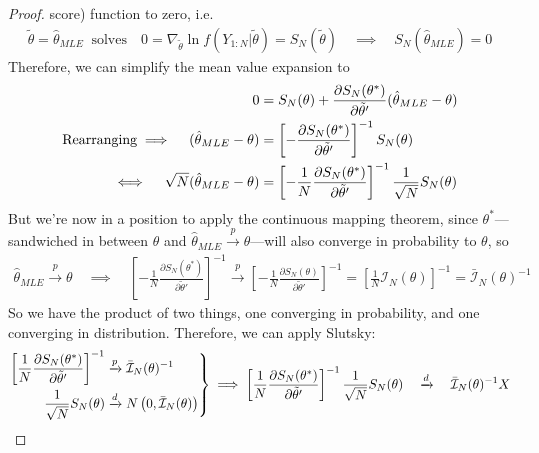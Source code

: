 \documentclass[12pt]{article}
\theoremstyle{plain}
\theoremstyle{definition}
\theoremstyle{remark}
\newcommand{\calI}{\mathcal{I}}
\newenvironment{rcases}
  {\left.\begin{aligned}}
  {\end{aligned}\right\rbrace}
\newcommand{\pto}{\xrightarrow{p}}
\newcommand{\dto}{\xrightarrow{d}}
\begin{document}
\begin{proof}
score) function to zero, i.e.
\begin{align*}
  \tilde{\theta} = \hat{\theta}_{MLE} \;\; \text{solves} \quad
  0 = \nabla_{\tilde{\theta}} \ln f(Y_{1:N}|\tilde{\theta})
  = S_N(\tilde{\theta})
  \quad\implies\quad
  S_N(\hat{\theta}_{MLE})=0
\end{align*}
Therefore, we can simplify the mean value expansion to
\begin{align}
  0
  &= S_N(\theta)
  + \frac{\partial S_N(\theta^*)}{\partial \tilde{\theta}'}
    (\hat{\theta}_{MLE} - \theta) \notag\\
  \text{Rearranging}
  \implies\quad
  (\hat{\theta}_{MLE} - \theta)
  &=
  \left[-\frac{\partial S_N(\theta^*)}{\partial \tilde{\theta}'}\right]^{-1}
  S_N(\theta) \notag\\
  \iff\quad
  \sqrt{N}(\hat{\theta}_{MLE} - \theta)
  &=
    \left[
    -
    \frac{1}{N}
    \frac{\partial S_N(\theta^*)}{\partial \tilde{\theta}'}
    \right]^{-1}
  \frac{1}{\sqrt{N}}S_N(\theta)
  \label{mleconverge}
\end{align}
But we're now in a position to apply the continuous mapping theorem,
since $\theta^*$---sandwiched in between $\theta$ and
$\hat{\theta}_{MLE}\pto \theta$---will also converge in probability to
$\theta$, so
\begin{align*}
  \hat{\theta}_{MLE}\pto \theta
  \quad\implies\quad
  \left[
    -
    \frac{1}{N}
    \frac{\partial S_N(\theta^*)}{\partial \tilde{\theta}'}
  \right]^{-1}
  \pto
  \left[
    -
    \frac{1}{N}
    \frac{\partial S_N(\theta)}{\partial \tilde{\theta}'}
  \right]^{-1}
  =
  \left[
    \frac{1}{N}
    \calI_N(\theta)
  \right]^{-1}
  = \bar{\calI}_N(\theta)^{-1}
\end{align*}
So we have the product of two things, one converging in probability, and
one converging in distribution. Therefore, we can apply Slutsky:
\begin{align*}
  \begin{rcases}
    \left[
      \frac{1}{N}
      \frac{\partial S_N(\theta^*)}{\partial \tilde{\theta}'}
    \right]^{-1}
    &\pto
    \bar{\calI}_N(\theta)^{-1}
    \\
    \frac{1}{\sqrt{N}}S_N(\theta)
    &\dto
    N\left(0,\bar{\calI}_N(\theta)\right)
  \end{rcases}
  \implies
  \left[
    \frac{1}{N}
    \frac{\partial S_N(\theta^*)}{\partial \tilde{\theta}'}
  \right]^{-1}
  \frac{1}{\sqrt{N}}S_N(\theta)
  \quad\dto\quad
  \bar{\calI}_N(\theta)^{-1} X
\end{align*}

\end{proof}
\end{document}
